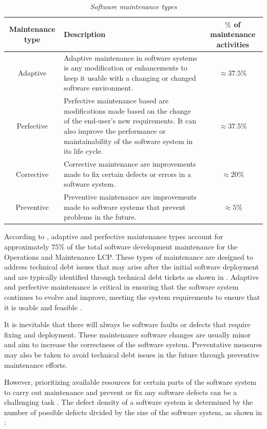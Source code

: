 \begin{table}[!htb]
	\centering
	\caption[Software maintenance types]
	{\textit{Software maintenance types \cite{Ping2010,Hasan2012}}}
	\label{tbl:ch1_maintenanceTypes}
	\begin{tabularx}{\textwidth}{|c|X|c|}
		\hline
		\textbf{Maintenance type} & \textbf{Description} & \textbf{$\%$ of maintenance activities} \\ \hline
		Adaptive & \raggedright Adaptive maintenance in software systems is any modification or enhancements to keep it usable with a changing or changed software environment. & $\approx 37.5\%$ \\ \hline
		Perfective & \raggedright Perfective maintenance based are modifications made based on the change of the end-user's new requirements. It can also improve the performance or maintainability of the software system in its life cycle. & $\approx 37.5\%$ \\ \hline
		Corrective & \raggedright Corrective maintenance are improvements made to fix certain defects or errors in a software system. & $\approx 20\%$ \\ \hline
		Preventive & \raggedright  Preventive maintenance are improvements made to software systems that prevent problems in the future. & $\approx 5\%$ \\ \hline
	\end{tabularx}
\end{table}

According to , adaptive and perfective maintenance types account for approximately $75\%$ of the total software development maintenance for the Operations and Maintenance LCP. These types of maintenance are designed to address technical debt issues that may arise after the initial software deployment and are typically identified through technical debt tickets as shown in . Adaptive and perfective maintenance is critical in ensuring that the software system continues to evolve and improve, meeting the system requirements to ensure that it is usable and feasible \cite{Kumar2013}.\par It is inevitable that there will always be software faults or defects that require fixing and deployment. These maintenance software changes are usually minor and aim to increase the correctness of the software system. Preventative measures may also be taken to avoid technical debt issues in the future through preventive maintenance efforts.\par However, prioritizing available resources for certain parts of the software system to carry out maintenance and prevent or fix any software defects can be a challenging task \cite{Mamone1994, Hasan2012}. The defect density of a software system is determined by the number of possible defects divided by the size of the software system, as shown in :


